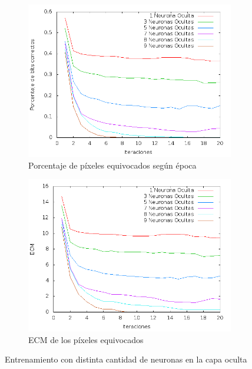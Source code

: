 \documentclass[12pt]{article}
\begin{document}
\begin{figure}[!ht]
\centering
    \begin{subfigure}[b]{0.5\textwidth}            
            \centering
            \includegraphics[width=\textwidth]{graficosde5neuronas/imagenDistancia}
            \caption{Porcentaje de p\'ixeles equivocados seg\'un \'epoca}
            \label{fig:dist_5}
    \end{subfigure}%
    \begin{subfigure}[b]{0.5\textwidth}
            \centering
            \includegraphics[width=\textwidth]{graficosde5neuronas/imagenECM}
            \caption{ECM de los p\'ixeles equivocados}
            \label{fig:ecm_5}
    \end{subfigure}
    \caption{Entrenamiento con distinta cantidad de neuronas en la capa oculta}
  \label{fig:graph5}
\end{figure}
\end{document}
